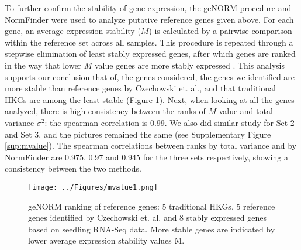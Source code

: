 \documentclass[11pt, a4paper]{article}
\begin{document}
To further confirm the stability of gene expression, the geNORM \citep{vandesompele2002accurate} procedure and %
NormFinder \citep{andersen2004normalization} 
 were used to analyze putative reference genes given above.  For each gene, an average expression stability ($M$) is calculated by a pairwise comparison within the reference set across all samples. This procedure is repeated through a stepwise elimination of least stably expressed genes, after which genes are ranked in the way that lower $M$ value genes are more stably expressed \citep{vandesompele2002accurate}. This analysis supports our conclusion that of, the genes considered, the genes we identified are more stable than reference genes by Czechowski et. al., and that traditional HKGs are among the least stable (Figure \ref{mvalue}). Next, when looking at all the genes analyzed, there is high consistency between the ranks of $M$ value and total variance $\sigma^2$: the spearman correlation is 0.99. We also did similar study for Set 2 and Set 3, and the pictures remained the same (see Supplementary Figure \ref{sup:mvalue}). The spearman correlations  between ranks by total variance and by NormFinder are 0.975, 0.97 and 0.945 for the three sets respectively, showing a consistency between the two methods. 

 \begin{figure}[h!]
\begin{center}
\texttt{[image: ../Figures/mvalue1.png]}
\caption{\label{mvalue} geNORM ranking of reference genes: 5 traditional HKGs, 5 reference genes identified by Czechowski et. al. and 8 stably expressed genes based on seedling RNA-Seq data.  More stable genes are indicated by lower average expression stability values M.  }
\end{center}
\end{figure}
\end{document}
